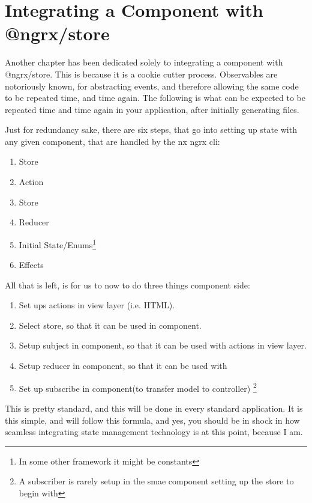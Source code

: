 \maketitle{}
\section{ Integrating a Component with @ngrx/store }

Another chapter has been dedicated solely to integrating a component
with @ngrx/store. This is because it is a cookie cutter process. Observables
are notoriously known, for abstracting events, and therefore allowing the same
code to be repeated time, and time again. The following is what can be expected
to be repeated time and time again in your application, after initially
generating files.

Just for redundancy sake, there are six steps, that go into setting up state
with any given component, that are handled by the nx ngrx cli:
\begin{enumerate}
  \item Store
  \item Action
  \item Store
  \item Reducer
  \item Initial State/Enums\footnote{In some other framework it might be constants}
  \item Effects
\end{enumerate}

All that is left, is for us to now to do three things component side:

\begin{enumerate}
  \item Set ups actions in view layer (i.e. HTML).
  \item Select store, so that it can be used in component.
  \item Setup subject in component, so that it can be used with actions in view layer.
  \item Setup reducer in component, so that it can be used with
  \item Set up subscribe in component(to transfer model to controller) \footnote{A subscriber is rarely setup in the smae component setting up the store to begin with}
\end{enumerate}

This is pretty standard, and this will be done in every standard application.
It is this simple, and will follow this formula, and yes, you should be in shock
in how seamless integrating state management technology is at this point,
because I am.


